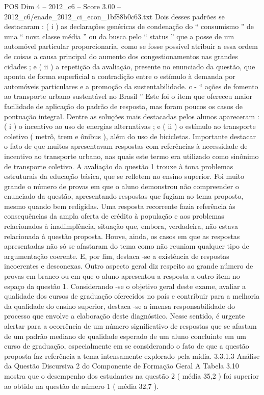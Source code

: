 \begin{textsample}{POS Dim 4 – 2012\_c6 – Score 3.00 – 2012\_c6/enade\_2012\_ci\_econ\_1bf88b0c63.txt}
Dois desses padrões se destacaram : ( i ) as declarações genéricas de condenação do “ consumismo ” de uma “ nova classe média ” ou da busca pelo “ status ” que a posse de um automóvel particular proporcionaria, como se fosse possível atribuir a essa ordem de coisas a causa principal do aumento dos congestionamentos nas grandes cidades ; e ( ii ) a repetição da avaliação, presente no enunciado da questão, que aponta de forma superficial a contradição entre o estímulo à demanda por automóveis particulares e a promoção da sustentabilidade. c - “ ações de fomento ao transporte urbano sustentável no Brasil ” Este foi o item que ofereceu maior facilidade de aplicação do padrão de resposta, mas foram poucos os casos de pontuação integral.
Dentre as soluções mais destacadas pelos alunos apareceram : ( i ) o incentivo ao uso de energias alternativas ; e ( ii ) o estímulo ao transporte coletivo ( metrô, trem e ônibus ), além do uso de bicicletas.
Importante destacar o fato de que muitos apresentavam respostas com referências à necessidade de incentivo ao transporte urbano, nas quais este termo era utilizado como sinônimo de transporte coletivo.
A avaliação da questão 1 trouxe à tona problemas estruturais da educação básica, que se refletem no ensino superior.
Foi muito grande o número de provas em que o aluno demonstrou não compreender o enunciado da questão, apresentando respostas que fugiam ao tema proposto, mesmo quando bem redigidas.
Uma resposta recorrente fazia referência às consequências da ampla oferta de crédito à população e aos problemas relacionados à inadimplência, situação que, embora, verdadeira, não estava relacionada à questão proposta.
Houve, ainda, os casos em que as respostas apresentadas não só se afastaram do tema como não reuniam qualquer tipo de argumentação coerente.
E, por fim, destaca -se a existência de respostas incoerentes e desconexas.
Outro aspecto geral diz respeito ao grande número de provas em branco ou em que o aluno apresentou a resposta a outro item no espaço da questão 1.
Considerando -se o objetivo geral deste exame, avaliar a qualidade dos cursos de graduação oferecidos no país e contribuir para a melhoria da qualidade do ensino superior, destaca -se a imensa responsabilidade do processo que envolve a elaboração deste diagnóstico.
Nesse sentido, é urgente alertar para a ocorrência de um número significativo de respostas que se afastam de um padrão mediano de qualidade esperado de um aluno concluinte em um curso de graduação, especialmente em se considerando o fato de que a questão proposta faz referência a tema intensamente explorado pela mídia. 3.3.1.3 Análise da Questão Discursiva 2 do Componente de Formação Geral A Tabela 3.10 mostra que o desempenho dos estudantes na questão 2 ( média 35,2 ) foi superior ao obtido na questão de número 1 ( média 32,7 ).

\end{textsample}
